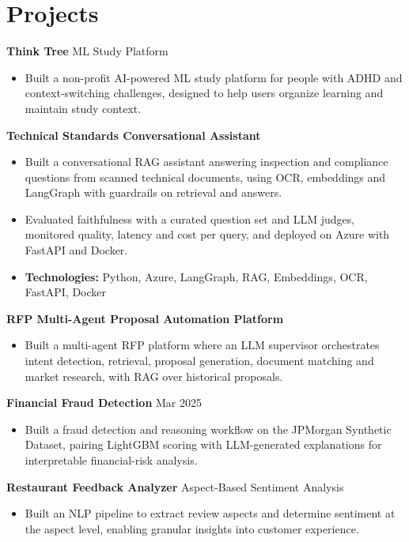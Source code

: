 \documentclass[10pt,a4paper]{article}
\begin{document}
\section{Projects}
\textbf{Think Tree} \textbar{} ML Study Platform\par
\begin{itemize}
  \item Built a non-profit AI-powered ML study platform for people with ADHD and context-switching challenges, designed to help users organize learning and maintain study context.
\end{itemize}
\textbf{Technical Standards Conversational Assistant}\par
\begin{itemize}
  \item Built a conversational RAG assistant answering inspection and compliance questions from scanned technical documents, using OCR, embeddings and LangGraph with guardrails on retrieval and answers.
  \item Evaluated faithfulness with a curated question set and LLM judges, monitored quality, latency and cost per query, and deployed on Azure with FastAPI and Docker.
  \item \textbf{Technologies:} Python, Azure, LangGraph, RAG, Embeddings, OCR, FastAPI, Docker
\end{itemize}
\textbf{RFP Multi-Agent Proposal Automation Platform}\par
\begin{itemize}
  \item Built a multi-agent RFP platform where an LLM supervisor orchestrates intent detection, retrieval, proposal generation, document matching and market research, with RAG over historical proposals.
\end{itemize}
\textbf{Financial Fraud Detection} \textbar{} Mar 2025\par
\begin{itemize}
  \item Built a fraud detection and reasoning workflow on the JPMorgan Synthetic Dataset, pairing LightGBM scoring with LLM-generated explanations for interpretable financial-risk analysis.
\end{itemize}
\textbf{Restaurant Feedback Analyzer} \textbar{} Aspect-Based Sentiment Analysis\par
\begin{itemize}
  \item Built an NLP pipeline to extract review aspects and determine sentiment at the aspect level, enabling granular insights into customer experience.
\end{itemize}
\end{document}
